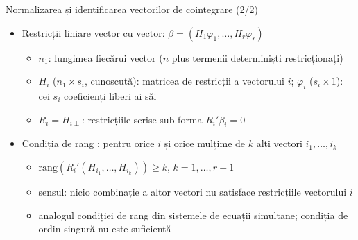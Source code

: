 \begin{frame}{Normalizarea și identificarea vectorilor de cointegrare (2/2)}
\itemsize{\small}
\begin{itemize}
    \item Restricții liniare vector cu vector: $\beta = (H_1\varphi_1, \dots, H_r\varphi_r)$
    \begin{itemize}
        \item $n_1$: lungimea fiecărui vector ($n$ plus termenii determiniști restricționați)
        \item $H_i$ ($n_1\times s_i$, cunoscută): matricea de restricții a vectorului $i$; $\varphi_i$ ($s_i\times 1$): cei $s_i$ coeficienți liberi ai săi
        \item $R_i = H_{i\perp}$: restricțiile scrise sub forma $R_i'\beta_i = 0$
    \end{itemize}
    \item Condiția de rang : pentru orice $i$ și orice mulțime de $k$ alți vectori $i_1, \dots, i_k$
    \begin{itemize}
        \item $\mathrm{rang}(R_i'(H_{i_1}, \dots, H_{i_k})) \ge k$, $k = 1, \dots, r - 1$
        \item sensul: nicio combinație a altor vectori nu satisface restricțiile vectorului $i$
        \item analogul condiției de rang din sistemele de ecuații simultane; condiția de ordin singură nu este suficientă
    \end{itemize}
\end{itemize}
\end{frame}

